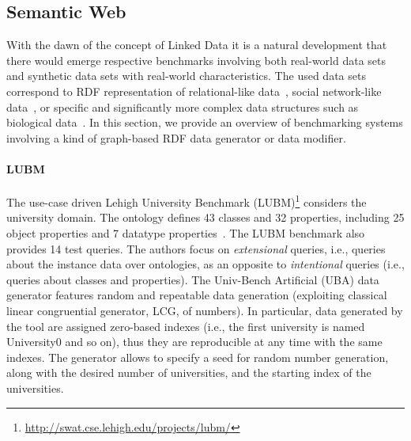 \subsection{Semantic Web}
\label{sec:generators_LinkedData}
With the dawn of the concept of Linked Data it is a natural development that there would emerge respective benchmarks involving both real-world data sets and synthetic data sets with real-world characteristics. The used data sets correspond to RDF representation of relational-like data~\cite{Guo2005158,Bizer09theberlin}, social network-like data~\cite{Schmidt2010}, or specific and significantly more complex data structures such as biological data~\cite{Wu2014}. In this section, we provide an overview of benchmarking systems involving a kind of graph-based RDF data generator or data modifier. %

\iffalse
Considering the Big Data world, the Linked Data in general definitely belong to this group since we assume that the Linked (Open) Data Sets form a common Linked Open Data cloud\footnote{\url{http://lod-cloud.net/}}. On the other hand, the particular data sets can be relatively small.
\fi

\paragraph{LUBM} The use-case driven Lehigh University Benchmark (LUBM)\footnote{\url{http://swat.cse.lehigh.edu/projects/lubm/}} considers the university domain. The ontology defines 43 classes and 32 properties, including 25 object properties and 7 datatype properties~\cite{Guo2005158}. The LUBM benchmark also provides 14 test queries. The authors focus on \emph{extensional} queries, i.e., queries about the instance data over ontologies, as an opposite to \emph{intentional} queries (i.e., queries about classes and properties). The Univ-Bench Artificial  (UBA) data generator features random and repeatable data generation (exploiting classical linear congruential generator, LCG, of numbers). In particular, data generated by the tool are assigned zero-based indexes (i.e., the first university is named University0 and so on), thus they are reproducible at any time with the same indexes.  The generator allows to specify a seed for random number generation, along with the desired number of universities, and the starting index of the universities.


